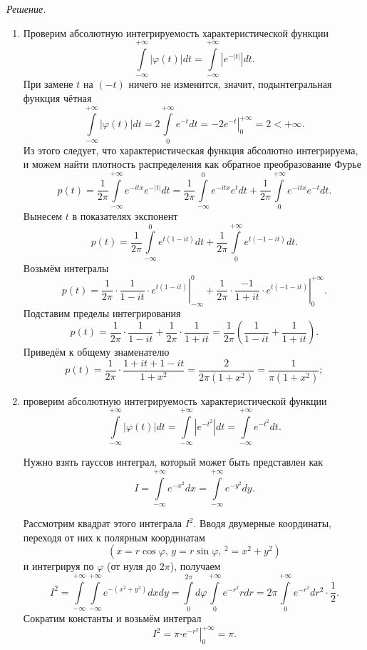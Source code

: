 \textit{Решение.}
\begin{enumerate}[label=\alph*)]
\item Проверим абсолютную интегрируемость характеристической функции
$$ \int \limits_{- \infty }^{+ \infty } \left| \varphi \left( t \right) \right| dt =
\int \limits_{- \infty }^{+ \infty } \left| e^{- \left| t \right| } \right| dt.$$
При замене $t$ на $ \left( - t \right) $ ничего не изменится, значит, подынтегральная функция чётная
$$ \int \limits_{- \infty }^{+ \infty } \left| \varphi \left( t \right) \right| dt =
2 \int \limits_0^{+ \infty } e^{- t} dt =
\left. -2e^{- t} \right|_0^{+ \infty } =
2 <
+ \infty.$$
Из этого следует, что характеристическая функция абсолютно интегрируема, и можем найти плотность распределения как обратное преобразование Фурье
$$p \left( t \right) =
\frac{1}{2 \pi } \int \limits_{- \infty }^{+ \infty } e^{- itx} e^{- \left| t \right| } dt =
\frac{1}{2 \pi } \int \limits_{- \infty }^0 e^{- itx} e^t dt + \frac{1}{2 \pi } \int \limits_0^{+ \infty } e^{- itx} e^{- t} dt.$$
Вынесем $t$ в показателях экспонент
$$p \left( t \right) =
\frac{1}{2 \pi } \int \limits_{- \infty }^0 e^{t \left( 1 - it \right) } dt + \frac{1}{2 \pi } \int \limits_0^{+ \infty } e^{t \left( - 1 - it \right) } dt.$$
Возьмём интегралы
$$p \left( t \right) =
\frac{1}{2 \pi } \cdot \left. \frac{1}{1 - it} \cdot e^{t \left( 1 - it \right) } \right|_{- \infty }^0 +
\frac{1}{2 \pi } \cdot \left. \frac{- 1}{1 + it} \cdot e^{t \left( - 1 - it \right) } \right|_0^{+ \infty }.$$
Подставим пределы интегрирования
$$p \left( t \right) =
\frac{1}{2 \pi } \cdot \frac{1}{1 - it} + \frac{1}{2 \pi } \cdot \frac{1}{1 + it} =
\frac{1}{2 \pi } \left( \frac{1}{1 - it} + \frac{1}{1 + it} \right).$$
Приведём к общему знаменателю
$$p \left( t \right) =
\frac{1}{2 \pi } \cdot \frac{1 + it + 1 - it}{1 + x^2} =
\frac{2}{2 \pi \left( 1 + x^2 \right) } =
\frac{1}{ \pi \left( 1 + x^2 \right) };$$
\item проверим абсолютную интегрируемость характеристической функции
$$ \int \limits_{- \infty }^{+ \infty } \left| \varphi \left( t \right) \right| dt =
\int \limits_{- \infty }^{+ \infty } \left| e^{- t^2} \right| dt =
\int \limits_{- \infty }^{+ \infty } e^{- t^2} dt.$$

Нужно взять гауссов интеграл, который может быть представлен как
$$I =
\int \limits_{- \infty }^{+ \infty } e^{- x^2} dx =
\int \limits_{- \infty }^{+ \infty } e^{- y^2} dy.$$

Рассмотрим квадрат этого интеграла $I^2$.
Вводя двумерные координаты,
переходя от них к полярным координатам
$$ \left( x = r \cos \varphi, \,
y = r \sin \varphi, \, 
^2 = x^2 + y^2 \right) $$
и интегрируя по $ \varphi $ (от нуля до $2 \pi $),
получаем
$$I^2 =
\int \limits_{- \infty }^{+ \infty } \int \limits_{- \infty }^{+ \infty } e^{- \left( x^2 + y^2 \right) } dxdy =
\int \limits_0^{2 \pi } d \varphi \int \limits_0^{+ \infty } e^{- r^2} rdr =
2 \pi \int \limits_0^{+ \infty } e^{- r^2} dr^2 \cdot \frac{1}{2}.$$
Сократим константы и возьмём интеграл
$$I^2 = 
\pi \left. \cdot e^{- r^2} \right|_0^{+ \infty } =
\pi.$$


\end{enumerate}
